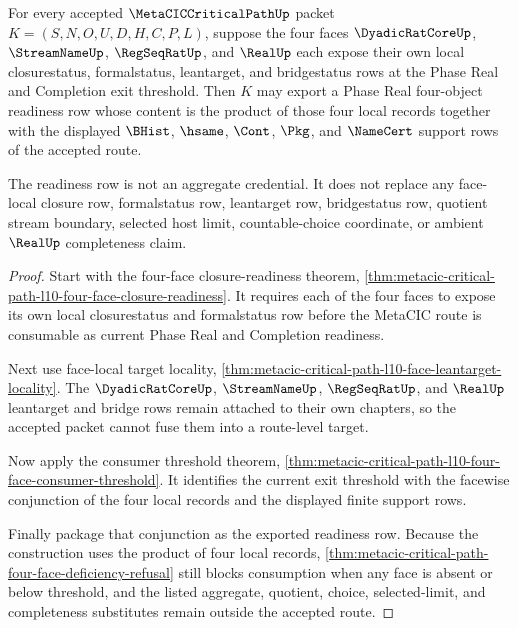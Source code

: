 \begin{theorem}
\label{thm:metaciccriticalpath-l10-four-object-ready}
For every accepted $\MetaCICCriticalPathUp$ packet $K=(S,N,O,U,D,H,C,P,L)$, suppose the four faces $\DyadicRatCoreUp$, $\StreamNameUp$, $\RegSeqRatUp$, and $\RealUp$ each expose their own local closurestatus, formalstatus, leantarget, and bridgestatus rows at the Phase Real and Completion exit threshold. Then $K$ may export a Phase Real four-object readiness row whose content is the product of those four local records together with the displayed $\BHist$, $\hsame$, $\Cont$, $\Pkg$, and $\NameCert$ support rows of the accepted route.

The readiness row is not an aggregate credential. It does not replace any face-local closure row, formalstatus row, leantarget row, bridgestatus row, quotient stream boundary, selected host limit, countable-choice coordinate, or ambient $\RealUp$ completeness claim.
\end{theorem}
\begin{proof}
Start with the four-face closure-readiness theorem, \autoref{thm:metacic-critical-path-l10-four-face-closure-readiness}. It requires each of the four faces to expose its own local closurestatus and formalstatus row before the MetaCIC route is consumable as current Phase Real and Completion readiness.

Next use face-local target locality, \autoref{thm:metacic-critical-path-l10-face-leantarget-locality}. The $\DyadicRatCoreUp$, $\StreamNameUp$, $\RegSeqRatUp$, and $\RealUp$ leantarget and bridge rows remain attached to their own chapters, so the accepted packet cannot fuse them into a route-level target.

Now apply the consumer threshold theorem, \autoref{thm:metacic-critical-path-l10-four-face-consumer-threshold}. It identifies the current exit threshold with the facewise conjunction of the four local records and the displayed finite support rows.

Finally package that conjunction as the exported readiness row. Because the construction uses the product of four local records, \autoref{thm:metacic-critical-path-four-face-deficiency-refusal} still blocks consumption when any face is absent or below threshold, and the listed aggregate, quotient, choice, selected-limit, and completeness substitutes remain outside the accepted route.
\end{proof}

